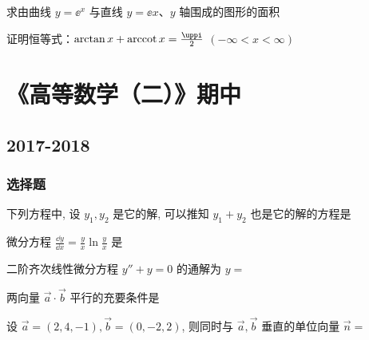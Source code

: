 \begin{ti}[6分]
	求由曲线 $y=\ee^x$ 与直线 $y=\ee x$、$y$ 轴围成的图形的面积
\end{ti}

\begin{ti}[6分]
	证明恒等式：$\arctan x + \arccot x = \frac{\uppi}{2}$ $(-\infty<x<\infty)$
\end{ti}

\section{《高等数学（二）》期中}
\subsection{2017-2018}
\subsubsection{选择题}
\begin{ti}
	下列方程中, 设 $y_{1},y_{2}$ 是它的解, 可以推知 $y_{1} + y_{2}$ 也是它的解的方程是 \kuo
\end{ti}

\begin{ti}
	微分方程 $\frac{\dd{y}}{\dd{x}} = \frac{y}{x} \ln \frac{y}{x}$ 是 \kuo
\end{ti}

\begin{ti}
	二阶齐次线性微分方程 $y'' + y = 0$ 的通解为 $y = $ \kuo
\end{ti}

\begin{ti}
	两向量 $\vec{a} \cdot \vec{b}$ 平行的充要条件是 \kuo
\end{ti}

\begin{ti}
	设 $\vec{a} = (2,4,-1), \vec{b} = (0,-2,2)$, 则同时与 $\vec{a},\vec{b}$ 垂直的单位向量 $\vec{n} = $ \kuo
\end{ti}

